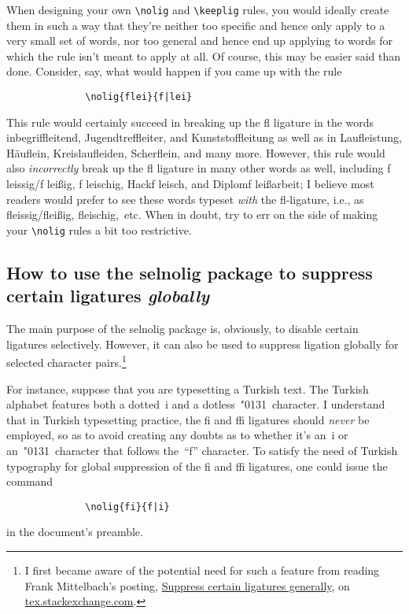\documentclass[11pt]{article}
\newcommand{\pkg}[1]{\textsf{#1}}
\newcommand{\cmmd}[1]{\texttt{\textbackslash #1}}
\begin{document}
When designing your own \cmmd{nolig} and \cmmd{keeplig} rules, you would ideally create them in such a way that they're neither too specific and hence only apply to a very small set of words, nor too general and hence end up applying to words for which the rule isn't meant to apply at all. Of course, this may be easier said than done. Consider, say, what would happen if you came up with the rule
\begin{Verbatim}
              \nolig{flei}{f|lei}
\end{Verbatim}
This rule would certainly succeed in breaking up the fl ligature in the words inbegriffleitend, Jugendtreffleiter, and Kunststoffleitung as well as in Laufleis\breaklig tung, Häuflein, Kreislaufleiden, Scherflein, and many more. However, this rule would also \emph{incorrectly} break up the fl ligature in many other words as well, including f\kern0pt leissig\slash f\kern0pt leißig, f\kern0pt leischig, Hackf\kern0pt leisch, and Diplomf\kern0pt leißarbeit; I believe most readers would prefer to see these words typeset \emph{with} the fl-ligature, i.e., as fleissig\slash fleißig, fleischig,~etc. When in doubt, try to err on the side of making your \cmmd{nolig} rules a bit too restrictive.



\subsection[How to use the selnolig package to suppress certain ligatures globally]{How to use the \pkg{selnolig} package to suppress certain ligatures \emph{globally}}
\label{sec:global-nolig}


The main purpose of the \pkg{selnolig} package is, obviously, to disable certain ligatures selectively. However, it can also be used to suppress ligation globally for selected character pairs.\footnote{I first became aware of the potential need for such a feature from reading Frank Mittelbach's posting, \href{http://tex.stackexchange.com/q/61042/5001}{Suppress certain ligatures generally}, on \url{tex.stackexchange.com}. } 

For instance, suppose that you are typesetting a Turkish text. The Turkish alphabet features both a dotted~i and a dotless~\char"0131\ character. I understand that in Turkish typesetting practice, the fi and ffi ligatures should \emph{never} be employed, so as to avoid creating any doubts as to whether it's an~i or an~\char"0131\ character that follows the~\enquote{f} character. To satisfy the need of Turkish typography for global suppression of the fi and ffi ligatures, one could issue the command
\begin{Verbatim}
              \nolig{fi}{f|i}
\end{Verbatim}
in the document's preamble.
\end{document}

